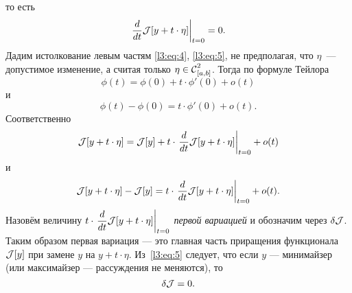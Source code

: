 то есть
\begin{equation}\label{l3:eq:5}
	\left.\der{}{t}\J[y+t\cdot\eta]\right|_{t=0}=0.
\end{equation}
Дадим истолкование левым частям \eqref{l3:eq:4}, \eqref{l3:eq:5}, не предполагая, что $\eta$~--- допустимое изменение, а считая только $\eta\in\Cfn[{[a,b]}]{2}$. Тогда по формуле Тейлора
\begin{equation*}
	\phi(t)=\phi(0)+t\cdot\phi'(0)+o(t)
\end{equation*}
и
\begin{equation*}
	\phi(t)-\phi(0)=t\cdot\phi'(0)+o(t).
\end{equation*}
Соответственно
\begin{equation*}
	\J[y+t\cdot\eta]=\J[y]+t\cdot\left.\der{}{t}\J[y+t\cdot\eta]\right|_{t=0}+o(t)
\end{equation*}
и
\begin{equation*}
	\J[y+t\cdot\eta]-\J[y]=t\cdot\left.\der{}{t}\J[y+t\cdot\eta]\right|_{t=0}+o(t).
\end{equation*}
Назовём величину $t\cdot\left.\displaystyle\der{}{t}\J[y+t\cdot\eta]\right|_{t=0}$ \emph{первой вариацией} и обозначим через $\delta\J$. Таким образом первая вариация --- это главная часть приращения функционала $\J[y]$ при замене $y$ на $y+t\cdot\eta$. Из~\eqref{l3:eq:5} следует, что если $y$ --- минимайзер (или максимайзер --- рассуждения не меняются), то 
\begin{equation}
	\label{l3:eq:6}
	\delta\J=0.
\end{equation}

